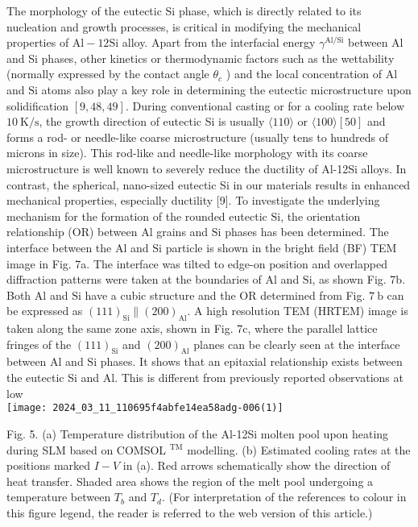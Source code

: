 \documentclass[10pt]{article}
\begin{document}
The morphology of the eutectic Si phase, which is directly related to its nucleation and growth processes, is critical in modifying the mechanical properties of $\mathrm{Al}-12 \mathrm{Si}$ alloy. Apart from the interfacial energy $\gamma^{\mathrm{Al} / \mathrm{Si}}$ between $\mathrm{Al}$ and Si phases, other kinetics or thermodynamic factors such as the wettability (normally expressed by the contact angle $\theta_{c}$ ) and the local concentration of $\mathrm{Al}$ and $\mathrm{Si}$ atoms also play a key role in determining the eutectic microstructure upon solidification $[9,48,49]$. During conventional casting or for a cooling rate below $10 \mathrm{~K} / \mathrm{s}$, the growth direction of eutectic Si is usually $\langle 110\rangle$ or $\langle 100\rangle[50]$ and forms a rod- or needle-like coarse microstructure (usually tens to hundreds of microns in size). This rod-like and needle-like morphology with its coarse microstructure is well known to severely reduce the ductility of Al-12Si alloys. In contrast, the spherical, nano-sized eutectic Si in our materials results in enhanced mechanical properties, especially ductility [9]. To investigate the underlying mechanism for the formation of the rounded eutectic $\mathrm{Si}$, the orientation relationship (OR) between $\mathrm{Al}$ grains and $\mathrm{Si}$ phases has been determined. The interface between the $\mathrm{Al}$ and $\mathrm{Si}$ particle is shown in the bright field (BF) TEM image in Fig. 7a. The interface was tilted to edge-on position and overlapped diffraction patterns were taken at the boundaries of $\mathrm{Al}$ and $\mathrm{Si}$, as shown Fig. 7b. Both $\mathrm{Al}$ and $\mathrm{Si}$ have a cubic structure and the OR determined from Fig. $7 \mathrm{~b}$ can be expressed as $(111)_{\mathrm{Si}} \|(200)_{\mathrm{Al}}$. A high resolution TEM (HRTEM) image is taken along the same zone axis, shown in Fig. 7c, where the parallel lattice fringes of the $(111)_{\mathrm{Si}}$ and $(200)_{\mathrm{Al}}$ planes can be clearly seen at the interface between $\mathrm{Al}$ and $\mathrm{Si}$ phases. It shows that an epitaxial relationship exists between the eutectic Si and Al. This is different from previously reported observations at low\\
\texttt{[image: 2024\_03\_11\_110695f4abfe14ea58adg-006(1)]}

Fig. 5. (a) Temperature distribution of the Al-12Si molten pool upon heating during SLM based on COMSOL ${ }^{\mathrm{TM}}$ modelling. (b) Estimated cooling rates at the positions marked $I-V$ in (a). Red arrows schematically show the direction of heat transfer. Shaded area shows the region of the melt pool undergoing a temperature between $T_{b}$ and $T_{d}$. (For interpretation of the references to colour in this figure legend, the reader is referred to the web version of this article.)
\end{document}
